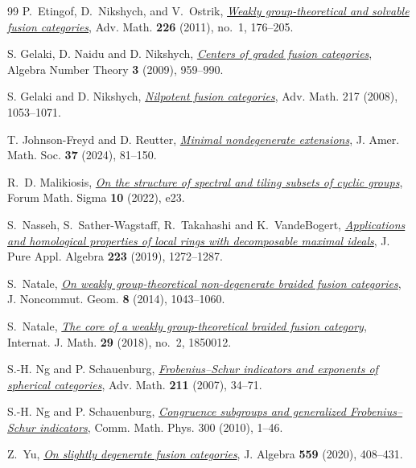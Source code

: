 \documentclass[11pt,a4paper]{article}
\numberwithin{equation}{section}
\theoremstyle{remark}
\begin{document}
\begin{thebibliography}{99}
P.~Etingof, D.~Nikshych, and V.~Ostrik,
\href{https://doi.org/10.1016/j.aim.2010.06.009}{\emph{Weakly group-theoretical and solvable fusion categories}},
Adv. Math. \textbf{226} (2011), no.~1, 176--205.

S. Gelaki, D. Naidu and D. Nikshych,
\href{https://msp.org/ant/2009/3-8/ant-v3-n8-p05-s.pdf}{\emph{Centers of graded fusion categories}},
Algebra Number Theory \textbf{3} (2009), 959--990.

S. Gelaki and D. Nikshych, \href{https://doi.org/10.1016/j.aim.2007.08.001}{\emph{Nilpotent fusion categories}}, Adv. Math. 217 (2008), 1053--1071.

T. Johnson-Freyd and D. Reutter, \href{https://doi.org/10.1090/jams/1023}{\emph{Minimal nondegenerate extensions}}, J. Amer. Math. Soc. \textbf{37} (2024), 81--150.

R.~D. Malikiosis, \href{https://doi.org/10.1017/fms.2022.14}{\emph{On the structure of spectral and tiling subsets of cyclic groups}}, Forum Math. Sigma \textbf{10} (2022), e23.

S.~Nasseh, S.~Sather-Wagstaff, R.~Takahashi and K.~VandeBogert,
\href{https://doi.org/10.1016/j.jpaa.2018.06.006}{\emph{Applications and homological properties of local rings with
decomposable maximal ideals}}, J. Pure Appl. Algebra \textbf{223}
(2019), 1272--1287.

S.~Natale,
\href{https://doi.org/10.4171/jncg/177}{\emph{On weakly group-theoretical non-degenerate braided fusion categories}},
J. Noncommut. Geom. \textbf{8} (2014), 1043--1060.

S.~Natale,
\href{https://doi.org/10.1142/S0129167X1850012X}{\emph{The core of a weakly group-theoretical braided fusion category}},
Internat. J. Math. \textbf{29} (2018), no.~2, 1850012.

S.-H. Ng and P. Schauenburg, \href{https://doi.org/10.1016/j.aim.2006.07.017}{\emph{Frobenius--Schur indicators and exponents of spherical categories}}, Adv. Math. \textbf{211} (2007), 34--71.

S.-H. Ng and P. Schauenburg, \href{https://doi.org/10.1007/s00220-010-1096-6}{\emph{Congruence subgroups and generalized Frobenius--Schur indicators}}, Comm. Math. Phys. 300 (2010), 1--46.

Z.~Yu,
\href{https://doi.org/10.1016/j.jalgebra.2020.04.022}{\emph{On slightly degenerate fusion categories}},
J. Algebra \textbf{559} (2020), 408--431.

\end{thebibliography}
\end{document}

